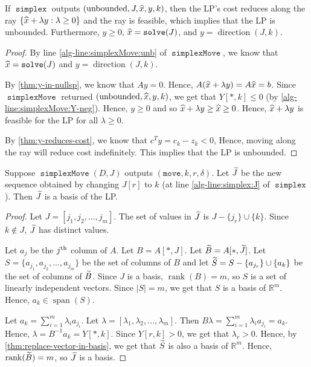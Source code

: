 \documentclass[a4paper, 12pt, fleqn]{article}
\DeclareMathOperator{\rank}{rank}
\DeclareMathOperator{\Span}{span}
\DeclareMathOperator{\direction}{direction}
\DeclareMathOperator{\solve}{\mathtt{solve}}
\DeclareMathOperator{\simplex}{\mathtt{simplex}}
\DeclareMathOperator{\simplexMove}{\mathtt{simplexMove}}
\newenvironment*{longProof}{\begin{proof}}{\end{proof}}
\begin{document}
\begin{theorem}
\label{thm:simplex-unbounded}
If $\simplex$ outputs $(\textrm{unbounded}, J, \widehat{x}, y, k)$,
then the LP's cost reduces along the ray $\{\widehat{x} + \lambda y: \lambda \ge 0\}$
and the ray is feasible, which implies that the LP is unbounded.
Furthermore, $y \ge 0$, $\xhat = \solve(J)$, and $y = \direction(J, k)$.
\end{theorem}
\begin{longProof}
By line \cref{alg-line:simplexMove:unb} of $\simplexMove$,
we know that $\xhat = \solve(J)$ and $y = \direction(J, k)$.

By \cref{thm:y-in-nullsp}, we know that $Ay = 0$.
Hence, $A(\widehat{x} + \lambda y) = A\widehat{x} = b$.
Since $\simplexMove$ returned $(\textrm{unbounded}, \widehat{x}, y, k)$,
we get that $Y[*,k] \le 0$ (by \cref{alg-line:simplexMove:Y-neg}).
Hence, $y \ge 0$ and so $\widehat{x} + \lambda y \ge \widehat{x} \ge 0$.
Hence, $\widehat{x} + \lambda y$ is feasible for the LP for all $\lambda \ge 0$.

By \cref{thm:y-reduces-cost}, we know that $c^Ty = c_k - z_k < 0$,
Hence, moving along the ray will reduce cost indefinitely.
This implies that the LP is unbounded.
\end{longProof}

\begin{lemma}
\label{thm:simplex-new-basis}
Suppose $\simplexMove(D, J)$ outputs $(\mathtt{move}, k, r, \delta)$.
Let $\widetilde{J}$ be the new sequence obtained by changing $J[r]$ to $k$
(at line \ref{alg-line:simplex:J} of $\simplex$).
Then $\widetilde{J}$ is a basis of the LP.
\end{lemma}
\begin{proof}
Let $J = [j_1, j_2, \ldots, j_m]$.
The set of values in $\widetilde{J}$ is $J - \{j_r\} \cup \{k\}$.
Since $k \not\in J$, $\widetilde{J}$ has distinct values.

Let $a_j$ be the $j^{\textrm{th}}$ column of $A$. Let $B = A[*,J]$. Let $\widetilde{B} = A[*,\widetilde{J}]$.
Let $S = \{a_{j_1}, a_{j_2}, \ldots, a_{j_m}\}$ be the set of columns of $B$
and let $\widetilde{S} = S - \{a_{j_r}\} \cup \{a_k\}$ be the set of columns of $\widetilde{B}$.
Since $J$ is a basis, $\rank(B) = m$, so $S$ is a set of linearly independent vectors.
Since $|S| = m$, we get that $S$ is a basis of $\mathbb{R}^m$. Hence, $a_k \in \Span(S)$.

Let $a_k = \sum_{i=1}^m \lambda_i a_{j_i}$. Let $\lambda = [\lambda_1, \lambda_2, \ldots, \lambda_m]$.
Then $B\lambda = \sum_{i=1}^m \lambda_i a_{j_i} = a_k$.
Hence, $\lambda = B^{-1}a_k = Y[*,k]$.
Since $Y[r,k] > 0$, we get that $\lambda_r > 0$.
Hence, by \cref{thm:replace-vector-in-basis}, we get that
$\widetilde{S}$ is also a basis of $\mathbb{R}^m$.
Hence, $\rank(\Btild) = m$, so $\widetilde{J}$ is a basis.
\end{proof}
\end{document}
